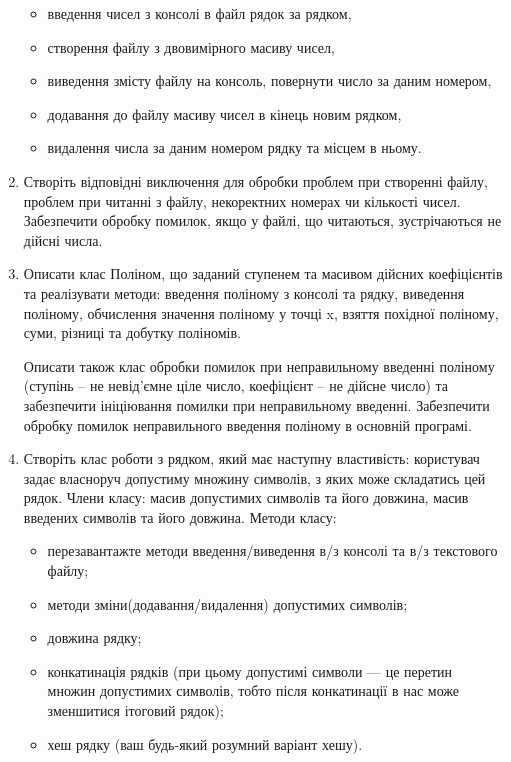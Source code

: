 \documentclass[]{article}
\begin{document}
\begin{enumerate}
  \begin{itemize}
  \item
    введення чисел з консолі в файл рядок за рядком,
  \item
    створення файлу з двовимірного масиву чисел,
  \item
    виведення змісту файлу на консоль, повернути число за даним номером,
  \item
    додавання до файлу масиву чисел в кінець новим рядком,
  \item
    видалення числа за даним номером рядку та місцем в ньому.
  \end{itemize}

\item
  Створіть відповідні виключення для обробки проблем при створенні
  файлу, проблем при читанні з файлу, некоректних номерах чи кількості
  чисел. Забезпечити обробку помилок, якщо у файлі, що читаються,
  зустрічаються не дійсні числа.

\item
  Описати клас Поліном, що заданий ступенем та масивом дійсних
  коефіцієнтів та реалізувати методи: введення поліному з консолі та
  рядку, виведення поліному, обчислення значення поліному у точці x,
  взяття похідної поліному, суми, різниці та добутку поліномів.

  Описати також клас обробки помилок при неправильному введенні поліному
  (ступінь -- не невід'ємне ціле число, коефіцієнт -- не дійсне число)
  та забезпечити ініціювання помилки при неправильному введенні.
  Забезпечити обробку помилок неправильного введення поліному в основній
  програмі.

\item
  Створіть клас роботи з рядком, який має наступну властивість:
  користувач задає власноруч допустиму множину символів, з яких може
  складатись цей рядок. Члени класу: масив допустимих символів та його
  довжина, масив введених символів та його довжина. Методи класу:

  \begin{itemize}
  \item
    перезавантажте методи введення/виведення в/з консолі та в/з
    текстового файлу;
  \item
    методи зміни(додавання/видалення) допустимих символів;
  \item
    довжина рядку;
  \item
    конкатинація рядків (при цьому допустимі символи --- це перетин
    множин допустимих символів, тобто після конкатинації в нас може
    зменшитися ітоговий рядок);
  \item
    хеш рядку (ваш будь-який розумний варіант хешу).
  \end{itemize}


\end{enumerate}
\end{document}
